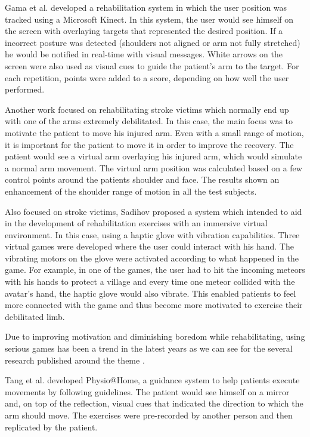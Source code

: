 \documentclass[runningheads]{llncs}
\begin{document}
Gama et al. \cite{Gama2012a} developed a rehabilitation system in which the user position was tracked using a 
Microsoft Kinect. In this system, the user would see himself on the screen with overlaying targets that represented the desired position. 
If a incorrect posture was detected (shoulders not aligned or arm not fully stretched) he would be notified in real-time with visual messages. 
White arrows on the screen were also used as visual cues to guide the patient's arm to the target.
For each repetition, points were added to a score, depending on how well the user performed.

Another work \cite{Klein2013} focused on rehabilitating stroke victims which normally end up with one of the arms extremely debilitated.
In this case, the main focus was to motivate the patient to move his injured arm. Even with a small range of motion, it is 
important for the patient to move it in order to improve the recovery. The patient would see a virtual arm overlaying his injured arm, which would simulate a normal arm movement. 
The virtual arm position was calculated based on a few control points around the patients shoulder and face. 
The results shown an enhancement of the shoulder range of motion in all the test subjects.

Also focused on stroke victims, Sadihov \cite{Sadihov2013} proposed a system which intended to aid in the development of 
rehabilitation exercises with an immersive virtual environment. In this case, using a haptic glove with vibration capabilities.  
Three virtual games were developed where the user could interact with his hand. The vibrating motors on the glove 
were activated according to what happened in the game. For example, in one of the games, the user had to hit 
the incoming meteors with his hands to protect a village and every time one meteor collided with the avatar's hand,
the haptic glove would also vibrate. This enabled patients to feel more connected with the game and thus become more motivated to exercise their debilitated limb.

Due to improving motivation and diminishing boredom while rehabilitating, using serious games
has been a trend in the latest years as we can see for the several 
research published around the theme \cite{Schonauer2011c, Ma2008, Burke2009, Borghese2013, Lange2012}. 

Tang et al. \cite{Tang2014a} developed Physio@Home, a guidance system to help patients execute movements by following
guidelines. The patient would see himself on a mirror and, on top of the reflection, visual cues that 
indicated the direction to which the arm should move. The exercises were pre-recorded by another person and 
then replicated by the patient.
\end{document}
